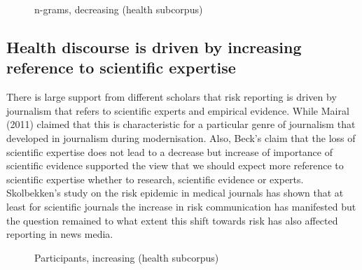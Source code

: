 \begin{figure}[htb!]
\centering
{}
\caption{n-grams, decreasing (health subcorpus)}
\end{figure}


\subsection{Health discourse is driven by increasing reference to scientific expertise}

There is large support from different scholars that risk reporting is driven by journalism that refers to scientific experts and empirical evidence. While Mairal (2011) claimed that this is characteristic for a particular genre of journalism that developed in journalism during modernisation. Also, Beck's claim that the loss of scientific expertise does not lead to a decrease but increase of importance of scientific evidence supported the view that we should expect more reference to scientific expertise whether to research, scientific evidence or experts. Skolbekken's study on the risk epidemic in medical journals has shown that at least for scientific journals the increase in risk communication has manifested but the question remained to what extent this shift towards risk has also affected reporting in news media. 

\begin{figure}[htb!]
\centering
{}
\caption{Participants, increasing (health subcorpus)}
\end{figure}

